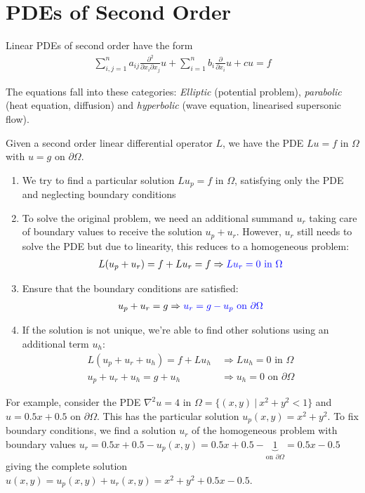 \section{PDEs of Second Order}

Linear PDEs of second order have the form
\begin{align*}
	\sum_{i,j=1}^n a_{ij}\frac{\partial ^2}{\partial x_i\partial x_j}u+\sum_{i=1}^nb_i\frac{\partial}{\partial x_i}u + cu = f
\end{align*}

The equations fall into these categories: 
\emph{Elliptic} (potential problem), \emph{parabolic} (heat equation, diffusion)
and \emph{hyperbolic} (wave equation, linearised supersonic flow).


Given a second order linear differential operator $L$,
we have the PDE $Lu = f \text{ in }\Omega$ with $u = g \text{ on }\partial\Omega$.

\begin{enumerate}
	\item We try to find a particular solution {\color{blue}$Lu_p = f$ in $\Omega$}, satisfying only the PDE and neglecting boundary conditions
	\item{
		To solve the original problem,
		we need an additional summand $u_r$ taking care of boundary values to receive the solution $u_p + u_r$.
		However, $u_r$ still needs to solve the PDE but due to linearity, this reduces to a homogeneous problem:
		\begin{align*}
			L(u_p + u_r) = f + Lu_r = f \Rightarrow{\color{blue} Lu_r = 0\text{ in }\Omega}
		\end{align*}
	}
	\item{
		Ensure that the boundary conditions are satisfied:
		\begin{align*}
			u_p+u_r = g \Rightarrow {\color{blue}u_r = g - u_p\text{ on }\partial\Omega}
		\end{align*}
	}
	\item{
		If the solution is not unique, we're able to find other solutions using an additional term $u_h$:
		\begin{align*}
			L(u_p + u_r + u_h) = f + Lu_h &\ \Rightarrow Lu_h = 0\text{ in }\Omega \\
			u_p + u_r + u_h = g + u_h &\ \Rightarrow u_h = 0\text{ on }\partial\Omega
		\end{align*}
	}
\end{enumerate}

For example, consider the PDE $\nabla^2 u = 4$ in $\Omega = \{(x,y)\ |\ x^2 + y^2 < 1\}$ and $u = 0.5x+0.5$ on $\partial\Omega$.
This has the particular solution $u_p(x,y)=x^2+y^2$. 
To fix boundary conditions, we find a solution $u_r$ of the homogeneous problem with boundary values
$u_r = 0.5x + 0.5 - u_p(x,y) = 0.5x + 0.5 - \underbrace{1}_{\text{on }\partial\Omega} = 0.5x - 0.5$ giving the complete solution
$u(x,y) = u_p(x,y) + u_r(x,y) = x^2 + y^2 + 0.5x - 0.5$.